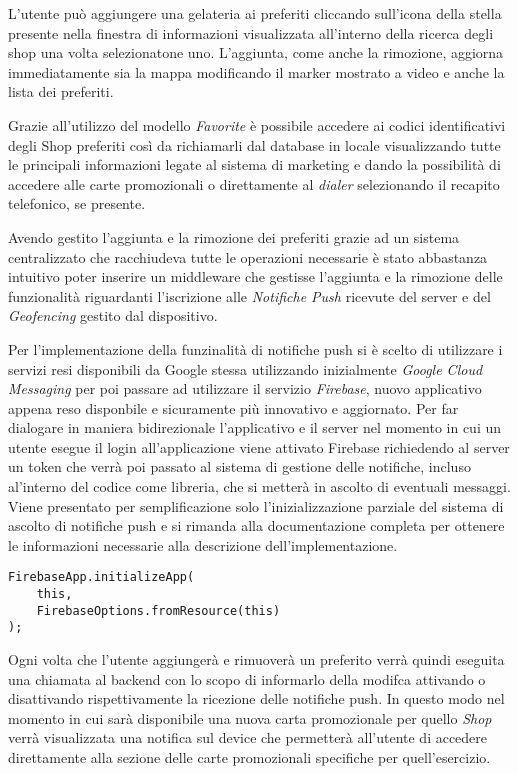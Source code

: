 L'utente può aggiungere una gelateria ai preferiti cliccando sull'icona
della stella presente nella finestra di informazioni visualizzata
all'interno della ricerca degli shop una volta selezionatone uno.
L'aggiunta, come anche la rimozione, aggiorna immediatamente sia la
mappa modificando il marker mostrato a video e anche la lista dei
preferiti.

Grazie all'utilizzo del modello \emph{Favorite} è possibile accedere
ai codici identificativi degli Shop preferiti così da richiamarli
dal database in locale visualizzando tutte le principali informazioni
legate al sistema di marketing e dando la possibilità di accedere
alle carte promozionali o direttamente al \emph{dialer }selezionando
il recapito telefonico, se presente.

Avendo gestito l'aggiunta e la rimozione dei preferiti grazie ad un
sistema centralizzato che racchiudeva tutte le operazioni necessarie
è stato abbastanza intuitivo poter inserire un middleware che gestisse
l'aggiunta e la rimozione delle funzionalità riguardanti l'iscrizione
alle \emph{Notifiche Push} ricevute del server e del \emph{Geofencing}
gestito dal dispositivo.

Per l'implementazione della funzinalità di notifiche push si è scelto
di utilizzare i servizi resi disponibili da Google stessa utilizzando
inizialmente \emph{Google Cloud Messaging} per poi passare ad utilizzare
il servizio \emph{Firebase}, nuovo applicativo appena reso disponbile
e sicuramente più innovativo e aggiornato. Per far dialogare in maniera
bidirezionale l'applicativo e il server nel momento in cui un utente
esegue il login all'applicazione viene attivato Firebase richiedendo
al server un token che verrà poi passato al sistema di gestione delle
notifiche, incluso al'interno del codice come libreria, che si metterà
in ascolto di eventuali messaggi. Viene presentato per semplificazione
solo l'inizializzazione parziale del sistema di ascolto di notifiche
push e si rimanda alla documentazione completa per ottenere le informazioni
necessarie alla descrizione dell'implementazione.

\begin{lstlisting}
FirebaseApp.initializeApp(
    this,
    FirebaseOptions.fromResource(this)
);
\end{lstlisting}
Ogni volta che l'utente aggiungerà e rimuoverà un preferito verrà
quindi eseguita una chiamata al backend con lo scopo di informarlo
della modifca attivando o disattivando rispettivamente la ricezione
delle notifiche push. In questo modo nel momento in cui sarà disponibile
una nuova carta promozionale per quello \emph{Shop} verrà visualizzata
una notifica sul device che permetterà all'utente di accedere direttamente
alla sezione delle carte promozionali specifiche per quell'esercizio.


